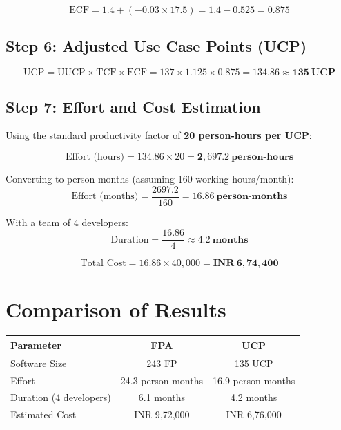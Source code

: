 \documentclass[12pt,a4paper]{article}
\begin{document}
\[
\text{ECF} = 1.4 + (-0.03 \times 17.5) = 1.4 - 0.525 = \mathbf{0.875}
\]

\subsection{Step 6: Adjusted Use Case Points (UCP)}

\[
\text{UCP} = \text{UUCP} \times \text{TCF} \times \text{ECF} = 137 \times 1.125 \times 0.875 = \mathbf{134.86 \approx 135~UCP}
\]

\subsection{Step 7: Effort and Cost Estimation}

Using the standard productivity factor of \textbf{20 person-hours per UCP}:

\[
\text{Effort (hours)} = 134.86 \times 20 = \mathbf{2{,}697.2~\text{person-hours}}
\]

\noindent Converting to person-months (assuming 160 working hours/month):
\[
\text{Effort (months)} = \frac{2697.2}{160} = \mathbf{16.86~\text{person-months}}
\]

With a team of 4 developers:
\[
\text{Duration} = \frac{16.86}{4} \approx \mathbf{4.2~\text{months}}
\]

\[
\text{Total Cost} = 16.86 \times 40{,}000 = \mathbf{\textrm{INR}~6,74,400}
\]

\section{Comparison of Results}

\begin{center}
\begin{tabular}{lcc}
\toprule
\textbf{Parameter} & \textbf{FPA} & \textbf{UCP} \\
\midrule
Software Size & 243 FP & 135 UCP \\
Effort & 24.3 person-months & 16.9 person-months \\
Duration (4 developers) & 6.1 months & 4.2 months \\
Estimated Cost & INR 9,72,000 & INR 6,76,000 \\
\bottomrule
\end{tabular}
\end{center}
\end{document}
